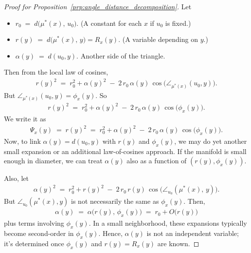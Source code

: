 \begin{proof}[Proof for Proposition~\ref{prp:angle_distance_decomposition}]
    Let
    \begin{itemize}
        \item \(r_0 \;=\; d\bigl(\mu^*(x),\,u_0\bigr)\).  (A constant for each \(x\) if \(u_0\) is fixed.)
        \item \(r(y) \;=\; d\bigl(\mu^*(x),\,y\bigr)=R_x(y)\).  (A variable depending on \(y\).)
        \item \(\alpha(y) \;=\; d(u_0,y)\).  Another side of the triangle.
    \end{itemize}
    Then from the local law of cosines,
    \begin{align*}
        r(y)^2 
        \;=\;
        r_0^2 + \alpha(y)^2 
        \;-\;
        2\,r_0\,\alpha(y)\,\cos\bigl(\angle_{\mu^*(x)}(u_0,y)\bigr).
    \end{align*}
    But \(\angle_{\mu^*(x)}(u_0,y)=\phi_x(y)\).
    So
    \begin{align*}
        r(y)^2
        \;=\;
        r_0^2 + \alpha(y)^2 \;-\; 2\,r_0\,\alpha(y)\,\cos\bigl(\phi_x(y)\bigr).
    \end{align*}
    We write it as
    \begin{align*}
        \Psi_x(y)
        \;=\;
        r(y)^2
        \;=\;
        r_0^2 + \alpha(y)^2 \;-\; 2\,r_0\,\alpha(y)\,\cos\bigl(\phi_x(y)\bigr).
    \end{align*}
    Now, to link \(\alpha(y)=d(u_0,y)\) with \(r(y)\) and \(\phi_x(y)\), we may do yet another small expansion or an additional law-of-cosines approach.
    If the manifold is small enough in diameter, we can treat \(\alpha(y)\) also as a function of \((r(y),\phi_x(y))\).

    Also, let
    \begin{align*}
        \alpha(y)^2
        \;=\;
        r_0^2 + r(y)^2 
        \;-\;
        2\,r_0\,r(y)\,\cos\bigl(\angle_{u_0}(\mu^*(x),\,y)\bigr).
    \end{align*}
    But \(\angle_{u_0}(\mu^*(x),y)\) is not necessarily the same as \(\phi_x(y)\).
    Then,
    \begin{align*}
        \alpha(y) 
        \;=\;
        \alpha\bigl(r(y),\,\phi_x(y)\bigr)
        \;=\;
        r_0 + O\bigl(r(y)\bigr)
    \end{align*}
    plus terms involving \(\phi_x(y)\). 
    In a small neighborhood, these expansions typically become second-order in \(\phi_x(y)\).
    Hence, \(\alpha(y)\) is not an independent variable; it’s determined once \(\phi_x(y)\) and \(r(y)=R_x(y)\) are known. 


\end{proof}

